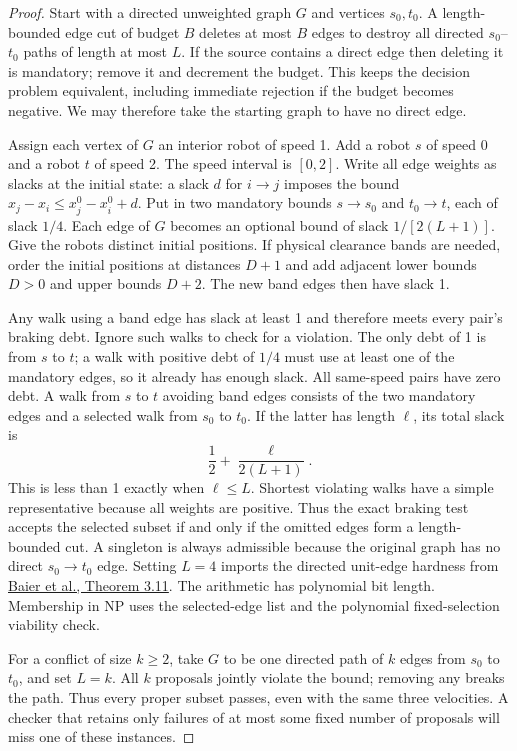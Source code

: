 \documentclass[11pt]{article}
\begin{document}
\begin{proof}
Start with a directed unweighted graph $G$ and vertices $s_0,t_0$. A length-bounded edge cut of budget $B$ deletes at most $B$ edges to destroy all directed $s_0$--$t_0$ paths of length at most $L$. If the source contains a direct edge then deleting it is mandatory; remove it and decrement the budget. This keeps the decision problem equivalent, including immediate rejection if the budget becomes negative. We may therefore take the starting graph to have no direct edge.

Assign each vertex of $G$ an interior robot of speed 1. Add a robot $s$ of speed 0 and a robot $t$ of speed 2. The speed interval is $[0,2]$. Write all edge weights as slacks at the initial state: a slack $d$ for $i\to j$ imposes the bound $x_j-x_i\le x_j^0-x_i^0+d$. Put in two mandatory bounds $s\to s_0$ and $t_0\to t$, each of slack $1/4$. Each edge of $G$ becomes an optional bound of slack $1/[2(L+1)]$. Give the robots distinct initial positions. If physical clearance bands are needed, order the initial positions at distances $D+1$ and add adjacent lower bounds $D>0$ and upper bounds $D+2$. The new band edges then have slack 1.

Any walk using a band edge has slack at least 1 and therefore meets every pair's braking debt. Ignore such walks to check for a violation. The only debt of 1 is from $s$ to $t$; a walk with positive debt of $1/4$ must use at least one of the mandatory edges, so it already has enough slack. All same-speed pairs have zero debt. A walk from $s$ to $t$ avoiding band edges consists of the two mandatory edges and a selected walk from $s_0$ to $t_0$. If the latter has length $\ell$, its total slack is
\[
 \frac12+\frac{\ell}{2(L+1)}.
\]
This is less than 1 exactly when $\ell\le L$. Shortest violating walks have a simple representative because all weights are positive. Thus the exact braking test accepts the selected subset if and only if the omitted edges form a length-bounded cut. A singleton is always admissible because the original graph has no direct $s_0\to t_0$ edge. Setting $L=4$ imports the directed unit-edge hardness from \href{https://page.math.tu-berlin.de/~skutella/TALG2010-final.pdf}{Baier et al., Theorem 3.11}. The arithmetic has polynomial bit length. Membership in NP uses the selected-edge list and the polynomial fixed-selection viability check.

For a conflict of size $k\ge2$, take $G$ to be one directed path of $k$ edges from $s_0$ to $t_0$, and set $L=k$. All $k$ proposals jointly violate the bound; removing any breaks the path. Thus every proper subset passes, even with the same three velocities. A checker that retains only failures of at most some fixed number of proposals will miss one of these instances.
\end{proof}
\end{document}
